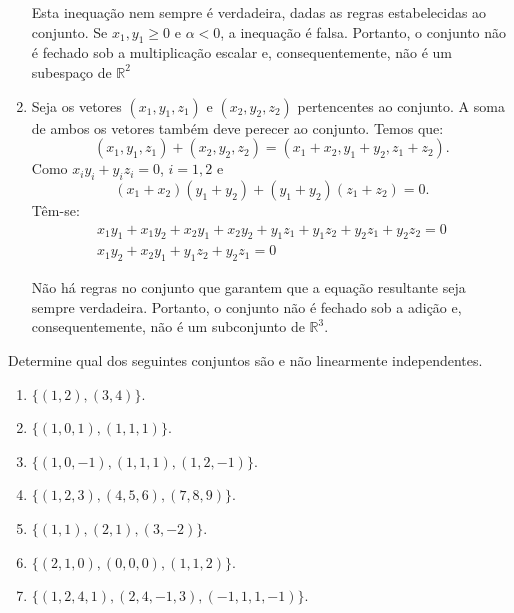 \begin{resolution}
\begin{enumerate}[label=\alph*)]
          Esta inequação nem sempre é verdadeira, dadas as regras estabelecidas ao conjunto. Se $x_1, y_1 \geq 0$ e $\alpha < 0$, a inequação é falsa. Portanto, o conjunto não é fechado sob a multiplicação escalar e, consequentemente, não é um subespaço de $\mathbb{R}^2$

    \item Seja os vetores $(x_1, y_1, z_1)$ e $(x_2, y_2, z_2)$ pertencentes ao conjunto. A soma de ambos os vetores também deve perecer ao conjunto. Temos que:
          \begin{equation}
            (x_1, y_1, z_1) + (x_2, y_2, z_2) = (x_1 + x_2, y_1 + y_2, z_1 + z_2).
          \end{equation}
          Como $x_i y_i + y_i z_i = 0$, $i = 1, 2$ e
          \begin{equation}
            (x_1 + x_2) (y_1 + y_2) + (y_1 + y_2)(z_1 + z_2) = 0.
          \end{equation}
          Têm-se:
          \begin{gather}
            x_1y_1 + x_1y_2 + x_2 y_1 + x_2 y_2 + y_1 z_1 + y_1 z_2 + y_2 z_1 + y_2 z_2 = 0 \\
            x_1y_2 + x_2 y_1 + y_1 z_2 + y_2 z_1 = 0
          \end{gather}

          Não há regras no conjunto que garantem que a equação resultante seja sempre verdadeira. Portanto, o conjunto não é fechado sob a adição e, consequentemente, não é um subconjunto de $\mathbb{R}^3$.
  \end{enumerate}
\end{resolution}

\begin{question}
  Determine qual dos seguintes conjuntos são e não linearmente independentes.
  \begin{enumerate}[label=\alph*)]
    \item $\{(1, 2), (3, 4)\}$.
    \item $\{(1, 0, 1), (1, 1, 1)\}$.
    \item $\{(1, 0, -1), (1, 1, 1), (1, 2, -1)\}$.
    \item $\{(1, 2, 3), (4, 5, 6), (7, 8, 9)\}$.
    \item $\{(1, 1), (2, 1), (3, -2)\}$.
    \item $\{(2, 1, 0), (0,0,0), (1, 1, 2)\}$.
    \item $\{(1, 2, 4, 1), (2, 4, -1, 3), (-1, 1, 1, -1)\}$.
  \end{enumerate}
\end{question}

